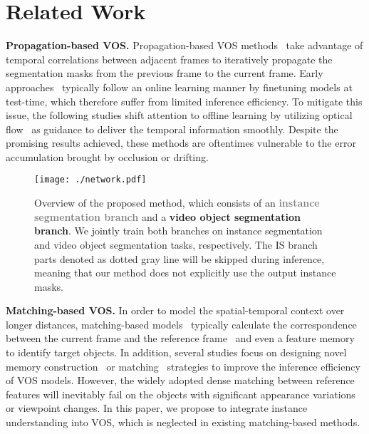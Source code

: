 \documentclass[10pt,twocolumn,letterpaper]{article}
\begin{document}
\section{Related Work}
\label{sec:related}
\noindent \textbf{Propagation-based VOS.} Propagation-based VOS methods~\cite{tsai2016video,cheng2017segflow,li2018video,oh2018fast,xu2018dynamic,yang2018efficient,duke2021sstvos,xu2022accelerating} take advantage of temporal correlations between adjacent frames to iteratively propagate the segmentation masks from the previous frame to the current frame. Early approaches~\cite{perazzi2017learning,caelles2017one,hu2017maskrnn} typically follow an online learning manner by finetuning models at test-time, which therefore suffer from limited inference efficiency. To mitigate this issue, the following studies shift attention to offline learning by utilizing optical flow~\cite{tsai2016video,cheng2017segflow,xu2018dynamic} as guidance to deliver the temporal information smoothly. Despite the promising results achieved, these methods are oftentimes vulnerable to the error accumulation brought by occlusion or drifting. 

\begin{figure*}[t]
  \centering
   \texttt{[image: ./network.pdf]}
   \vspace{-0.25in}
   \caption{Overview of the proposed method, which consists of an \textbf{\textcolor{gray}{instance segmentation branch}} and a \textbf{video object segmentation branch}. We jointly train both branches on instance segmentation and video object segmentation tasks, respectively. The IS branch parts denoted as dotted gray line will be skipped during inference, meaning that our method does not explicitly use the output instance masks.}
   \label{fig:network}
\end{figure*}

\vspace{0.02in}
\noindent \textbf{Matching-based VOS.} In order to model the spatial-temporal context over longer distances, matching-based models~\cite{hu2018videomatch,oh2019video,cheng2021mivos,cheng2021stcn} typically calculate the correspondence between the current frame and the reference frame~\cite{hu2018videomatch,chen2018blazingly,voigtlaender2019feelvos,yang2020collaborative} and even a feature memory~\cite{hu2021learning,liang2020video,lu2020video,seong2020kernelized,seong2021hierarchical,xie2021efficient,cheng2022xmem} to identify target objects. In addition, several studies focus on designing novel memory construction~\cite{li2020fast,liang2020video} or matching~\cite{wang2021swiftnet} strategies to improve the inference efficiency of VOS models. However, the widely adopted dense matching between reference features will inevitably fail on the objects with significant appearance variations or viewpoint changes. In this paper, we propose to integrate instance understanding into VOS, which is neglected in existing matching-based methods.
\end{document}
